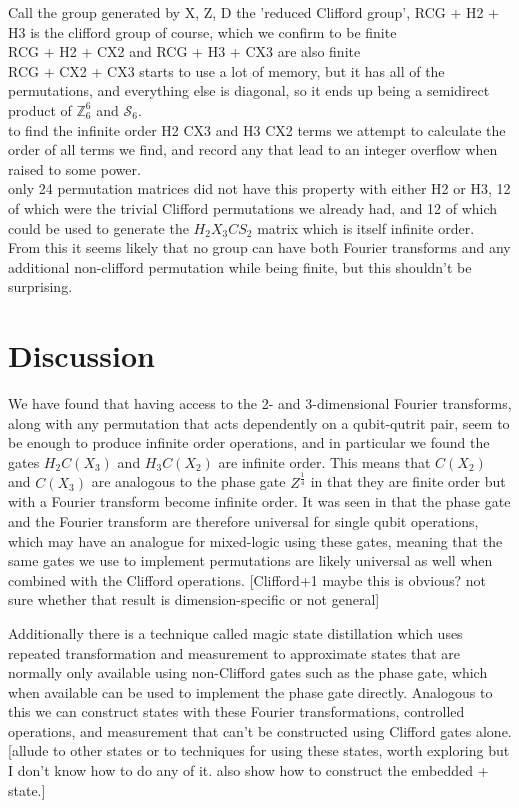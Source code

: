 Call the group generated by X, Z, D the 'reduced Clifford group', RCG + H2 + H3 is the clifford group of course, which we confirm to be finite
\\RCG + H2 + CX2 and RCG + H3 + CX3 are also finite
\\RCG + CX2 + CX3 starts to use a lot of memory, but it has all of the permutations, and everything else is diagonal, so it ends up being a semidirect product of $\mathbb{Z}_6^6$ and $\mathcal{S}_6$.
\\to find the infinite order H2 CX3 and H3 CX2 terms we attempt to calculate the order of all terms we find, and record any that lead to an integer overflow when raised to some power.
\\only 24 permutation matrices did not have this property with either H2 or H3, 12 of which were the trivial Clifford permutations we already had, and 12 of which could be used to generate the $H_2 X_3 CS_2$ matrix which is itself infinite order.
\\From this it seems likely that no group can have both Fourier transforms and any additional non-clifford permutation while being finite, but this shouldn't be surprising.

\section{Discussion}
We have found that having access to the 2- and 3-dimensional Fourier transforms, along with any permutation that acts dependently on a qubit-qutrit pair, seem to be enough to produce infinite order operations, and in particular we found the gates $H_2 C(X_3)$ and $H_3 C(X_2)$ are infinite order. This means that $C(X_2)$ and $C(X_3)$ are analogous to the phase gate $Z^{\frac{1}{4}}$ in that they are finite order but with a Fourier transform become infinite order. It was seen in \cite{universal-qubit} that the phase gate and the Fourier transform are therefore universal for single qubit operations, which may have an analogue for mixed-logic using these gates, meaning that the same gates we use to implement permutations are likely universal as well when combined with the Clifford operations. [Clifford+1 maybe this is obvious? not sure whether that result is dimension-specific or not general]

Additionally there is a technique called magic state distillation which uses repeated transformation and measurement to approximate states that are normally only available using non-Clifford gates such as the phase gate, which when available can be used to implement the phase gate directly. Analogous to this we can construct states with these Fourier transformations, controlled operations, and measurement that can't be constructed using Clifford gates alone. [allude to other states or to techniques for using these states, worth exploring but I don't know how to do any of it. also show how to construct the embedded + state.]